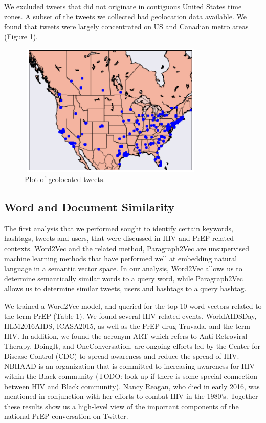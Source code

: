 \documentclass{sig-alternate-05-2015}
\begin{document}
We excluded tweets that did not originate in contiguous United States time zones. A subset of the tweets we collected had geolocation data available. We found that tweets were largely concentrated on US and Canadian metro areas (Figure 1).


\begin{figure}
\centering
\includegraphics[height=2.5in, width=3.5in]{map}
\caption{Plot of geolocated tweets.}
\end{figure}

\subsection{Word and Document Similarity}

The first analysis that we performed sought to identify certain keywords, hashtags, tweets and users, that were discussed in HIV and PrEP related contexts. Word2Vec and the related method, Paragraph2Vec are unsupervised machine learning methods that have performed well at embedding natural language in a semantic vector space. In our analysis, Word2Vec allows us to determine semantically similar words to a query word, while Paragraph2Vec allows us to determine similar tweets, users and hashtags to a query hashtag.

We trained a Word2Vec model, and queried for the top 10 word-vectors related to the term PrEP (Table 1). We found several HIV related events, WorldAIDSDay, HLM2016AIDS, ICASA2015, as well as the PrEP drug Truvada, and the term HIV. In addition, we found the acronym ART which refers to Anti-Retroviral Therapy. DoingIt, and OneConversation, are ongoing efforts led by the Center for Disease Control (CDC) to spread awareness and reduce the spread of HIV. NBHAAD is an organization that is committed to increasing awareness for HIV within the Black community (TODO: look up if there is some special connection between HIV and Black community). Nancy Reagan, who died in early 2016, was mentioned in conjunction with her efforts to combat HIV in the 1980's. Together these results show us a high-level view of the important components of the national PrEP conversation on Twitter.
\end{document}
